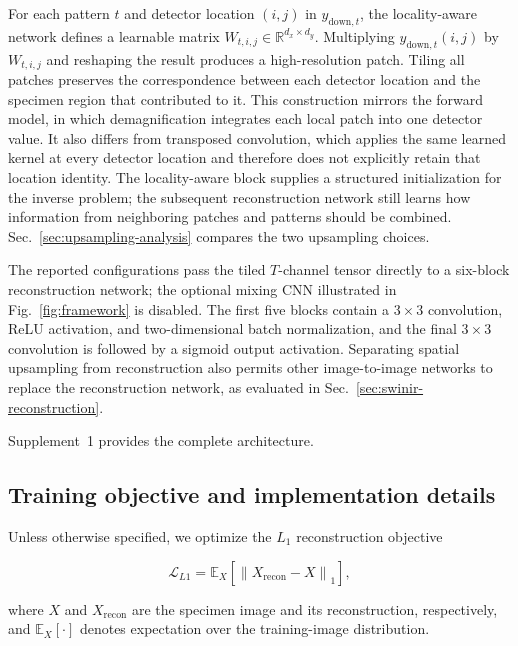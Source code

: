 \documentclass{optica-article}
\begin{document}
For each pattern $t$ and detector location $(i,j)$ in $y_{\mathrm{down},t}$, the locality-aware network defines a learnable matrix $W_{t,i,j}\in\mathbb{R}^{d_x\times d_y}$. Multiplying $y_{\mathrm{down},t}(i,j)$ by $W_{t,i,j}$ and reshaping the result produces a high-resolution patch. Tiling all patches preserves the correspondence between each detector location and the specimen region that contributed to it. This construction mirrors the forward model, in which demagnification integrates each local patch into one detector value. It also differs from transposed convolution, which applies the same learned kernel at every detector location and therefore does not explicitly retain that location identity. The locality-aware block supplies a structured initialization for the inverse problem; the subsequent reconstruction network still learns how information from neighboring patches and patterns should be combined. Sec.~\ref{sec:upsampling-analysis} compares the two upsampling choices.

The reported configurations pass the tiled $T$-channel tensor directly to a six-block reconstruction network; the optional mixing CNN illustrated in Fig.~\ref{fig:framework} is disabled. The first five blocks contain a $3\times3$ convolution, ReLU activation, and two-dimensional batch normalization, and the final $3\times3$ convolution is followed by a sigmoid output activation. Separating spatial upsampling from reconstruction also permits other image-to-image networks to replace the reconstruction network, as evaluated in Sec.~\ref{sec:swinir-reconstruction}.

Supplement~1 provides the complete architecture.

\subsection{Training objective and implementation details}

Unless otherwise specified, we optimize the $L_1$ reconstruction objective

\begin{equation}
    \mathcal{L}_{L1} = \mathbb{E}_X \left[ \left\| X_{\mathrm{recon}} - X \right\|_1 \right],
    \label{eq:l1-loss}
\end{equation}

where $X$ and $X_{\mathrm{recon}}$ are the specimen image and its reconstruction, respectively, and $\mathbb{E}_X[\cdot]$ denotes expectation over the training-image distribution.
\end{document}
